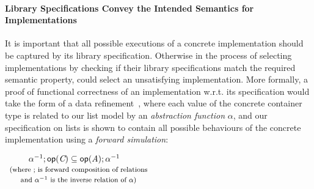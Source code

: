 \paragraph*{Library Specifications Convey the Intended Semantics for Implementations} It is important that all possible executions of a concrete implementation should be captured by its library specification. Otherwise in the process of selecting implementations by checking if their library specifications match the required semantic property, \Primrose{} could select an unsatisfying implementation. More formally, a proof of functional correctness of an implementation w.r.t. its specification would take the form of a data refinement~\citep{de_roever_engelhardt_1998},
where each value of the concrete container type is related to our list model by an \emph{abstraction function} $\alpha$, and our specification on lists is shown to contain all possible behaviours 
of the concrete implementation using a \emph{forward simulation}:
\vspace{-.5em}
\begin{center}
  $\begin{array}{c}\alpha^{-1};\mathsf{op(\textit{C})}  \subseteq
  \mathsf{op(\textit{A})}; \alpha^{-1}\quad\\\text{\footnotesize (where ; is forward composition of relations} \\\text{\footnotesize and $\alpha^{-1}$ is the inverse relation of $\alpha$)}\end{array}$
\end{center}


